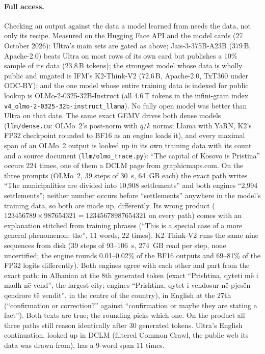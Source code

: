 \documentclass[11pt]{article}
\begin{document}
\paragraph{Full access.} Checking an output against the data a model learned from needs the data, not only its recipe.
Measured on the Hugging Face API and the model cards (27 October 2026): Ultra's main sets are gated as above; Jais-3-375B-A23B
(379\,B, Apache-2.0) beats Ultra on most rows of its own card but publishes a 10\% sample of its data (23.8\,B tokens); the
strongest model whose data is wholly public and ungated is IFM's K2-Think-V2 (72.6\,B, Apache-2.0, TxT360 under ODC-BY);
and the one model whose entire training data is indexed for public lookup is OLMo-2-0325-32B-Instruct (all 4.6\,T tokens in
the infini-gram index \texttt{v4\_olmo-2-0325-32b-instruct\_llama}). No fully open model was better than Ultra on that date. The same
exact GEMV drives both dense models (\texttt{llm/dense.cu}: OLMo~2's post-norm with $q$/$k$ norms; Llama with YaRN, K2's FP32
checkpoint rounded to BF16 as an engine loads it), and every maximal span of an OLMo~2 output is looked up in its own
training data with its count and a source document (\texttt{llm/olmo\_trace.py}): ``The capital of Kosovo is Pristina''
occurs 224 times, one of them a DCLM page from graphicmaps.com. On the three prompts (OLMo~2, 39 steps of 30~s, 64~GB each)
the exact path writes ``The municipalities are divided into 10,908 settlements'' and both engines ``2,994 settlements'';
neither number occurs before ``settlements'' anywhere in the model's training data, so both are made up, differently. Its
wrong product ($123456789\times987654321=12345678987654321$ on every path) comes with an explanation stitched from training
phrases (``This is a special case of a more general phenomenon: the'', 11 words, 22 times). K2-Think-V2 runs the same nine
sequences from disk (39 steps of 93--106~s, 274~GB read per step, none uncertified; the engine rounds 0.01--0.02\% of the
BF16 outputs and 69--81\% of the FP32 logits differently). Both engines agree with each other and part from the exact path:
in Albanian at the 8th generated token (exact ``Prishtina, qyteti më i madh në vend'', the largest city; engines ``Prishtina,
qytet i vendosur në pjesën qendrore të vendit'', in the centre of the country), in English at the 27th (``confirmation or
correction?'' against ``confirmation or maybe they are stating a fact''). Both texts are true; the rounding picks which
one. On the product all three paths still reason identically after 30 generated tokens. Ultra's English continuation,
looked up in DCLM (filtered Common Crawl, the public web its data was drawn from), has a 9-word span 11 times.
\end{document}
